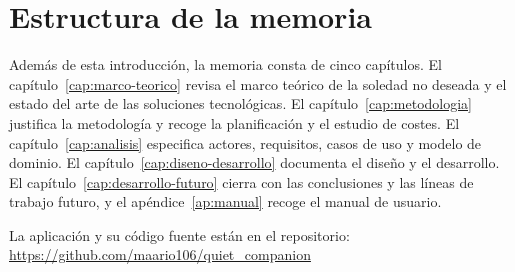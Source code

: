 \section{Estructura de la memoria}

Además de esta introducción, la memoria consta de cinco capítulos. El capítulo~\ref{cap:marco-teorico} revisa el marco teórico de la soledad no deseada y el estado del arte de las soluciones tecnológicas. El capítulo~\ref{cap:metodologia} justifica la metodología y recoge la planificación y el estudio de costes. El capítulo~\ref{cap:analisis} especifica actores, requisitos, casos de uso y modelo de dominio. El capítulo~\ref{cap:diseno-desarrollo} documenta el diseño y el desarrollo. El capítulo~\ref{cap:desarrollo-futuro} cierra con las conclusiones y las líneas de trabajo futuro, y el apéndice~\ref{ap:manual} recoge el manual de usuario.

La aplicación y su código fuente están en el repositorio:
\newline
\url{https://github.com/maario106/quiet_companion}
